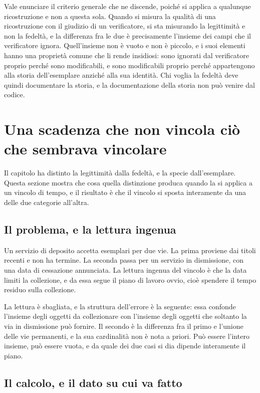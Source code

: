 Vale enunciare il criterio generale che ne discende, poiché si applica a qualunque ricostruzione e non a questa sola. Quando si misura la qualità di una ricostruzione con il giudizio di un verificatore, si sta misurando la legittimità e non la fedeltà, e la differenza fra le due è precisamente l'insieme dei campi che il verificatore ignora. Quell'insieme non è vuoto e non è piccolo, e i suoi elementi hanno una proprietà comune che li rende insidiosi: sono ignorati dal verificatore proprio perché sono modificabili, e sono modificabili proprio perché appartengono alla storia dell'esemplare anziché alla sua identità. Chi voglia la fedeltà deve quindi documentare la storia, e la documentazione della storia non può venire dal codice.
\section{Una scadenza che non vincola ciò che sembrava vincolare}

Il capitolo ha distinto la legittimità dalla fedeltà, e la specie dall'esemplare. Questa sezione mostra che cosa quella distinzione produca quando la si applica a un vincolo di tempo, e il risultato è che il vincolo si sposta interamente da una delle due categorie all'altra.

\subsection*{Il problema, e la lettura ingenua}

Un servizio di deposito accetta esemplari per due vie. La prima proviene dai titoli recenti e non ha termine. La seconda passa per un servizio in dismissione, con una data di cessazione annunciata. La lettura ingenua del vincolo è che la data limiti la collezione, e da essa segue il piano di lavoro ovvio, cioè spendere il tempo residuo sulla collezione.

La lettura è sbagliata, e la struttura dell'errore è la seguente: essa confonde l'insieme degli oggetti da collezionare con l'insieme degli oggetti che soltanto la via in dismissione può fornire. Il secondo è la differenza fra il primo e l'unione delle vie permanenti, e la sua cardinalità non è nota a priori. Può essere l'intero insieme, può essere vuota, e da quale dei due casi si dia dipende interamente il piano.

\subsection*{Il calcolo, e il dato su cui va fatto}

